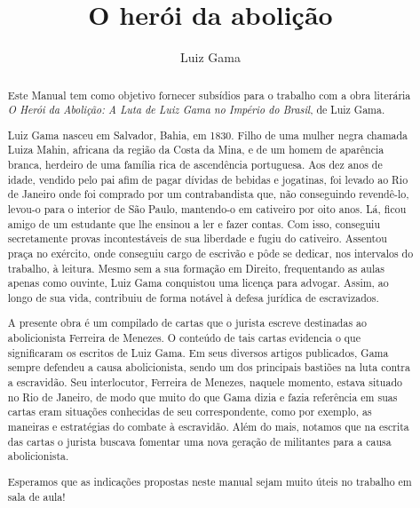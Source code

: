 \documentclass[12pt]{extarticle}
\begin{document}
\newcommand{\AutorLivro}{Luiz Gama}
\newcommand{\TituloLivro}{O herói da abolição}
\newcommand{\Tema}{Diálogos com a sociologia e com a antropologia}
\newcommand{\Genero}{Diário, biografia, autobiografia, relatos, memórias}
\newcommand{\imagemCapa}{./images/PNLD0016-01.png}
\newcommand{\issnppub}{---}
\newcommand{\issnepub}{---}
\newcommand{\colaborador}{\textbf{Eduardo Modesto de Carvalho, Bruno Gradella e Vicente Castro}}


\title{\TituloLivro}
\author{\AutorLivro}
\def\authornotes{\colaborador}

\date{}
\maketitle

\begin{abstract}
Este Manual tem como objetivo fornecer subsídios para o trabalho com a
obra literária \emph{O Herói da Abolição: A Luta de Luiz Gama no Império
do Brasil}, de Luiz Gama.

Luiz Gama nasceu em Salvador, Bahia, em 1830. Filho de uma mulher negra chamada 
Luiza Mahin, africana da região da Costa da Mina, e de um homem de aparência branca, 
herdeiro de uma família rica de ascendência portuguesa. Aos dez anos de idade, vendido 
pelo pai afim de pagar dívidas de bebidas e jogatinas, foi levado ao Rio de Janeiro 
onde foi comprado por um contrabandista que, não conseguindo revendê-lo, levou-o
para o interior de São Paulo, mantendo-o em cativeiro por oito anos. Lá, ficou amigo 
de um estudante que lhe ensinou a ler e fazer contas. Com isso, conseguiu secretamente 
provas incontestáveis de sua liberdade e fugiu do cativeiro. Assentou praça no exército, 
onde conseguiu cargo de escrivão e pôde se dedicar, nos intervalos do trabalho, à leitura. 
Mesmo sem a sua formação em Direito, frequentando as aulas apenas como ouvinte, 
Luiz Gama conquistou uma licença para advogar. Assim, ao longo de sua vida,
contribuiu de forma notável à defesa jurídica de escravizados. 

A presente obra é um compilado de cartas que o jurista escreve destinadas ao
abolicionista Ferreira de Menezes. O conteúdo de tais cartas evidencia
o que significaram os escritos de Luiz Gama. Em seus diversos artigos publicados, Gama 
sempre defendeu a causa abolicionista, sendo um dos principais bastiões na luta 
contra a escravidão. Seu interlocutor, Ferreira de Menezes, naquele momento, 
estava situado no Rio de Janeiro, de modo que muito do que Gama dizia e fazia 
referência em suas cartas eram situações conhecidas de seu correspondente, 
como por exemplo, as maneiras e estratégias do combate à escravidão. 
Além do mais, notamos que na escrita das cartas o jurista buscava fomentar uma 
nova geração de militantes para a causa abolicionista.

Esperamos que as indicações propostas neste manual sejam muito úteis no trabalho em
sala de aula! 
\end{abstract}
\end{document}
